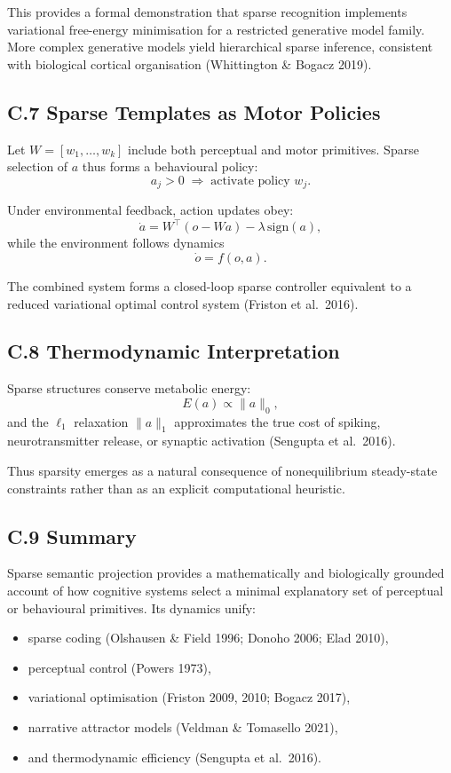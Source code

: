 \documentclass[11pt,a4paper,twoside]{article}
\begin{document}
This provides a formal demonstration that sparse recognition implements variational free-energy minimisation for a restricted generative model family. More complex generative models yield hierarchical sparse inference, consistent with biological cortical organisation (Whittington \& Bogacz 2019).

\subsection*{C.7 Sparse Templates as Motor Policies}

Let $W = [w_1,\dots,w_k]$ include both perceptual and motor primitives. Sparse selection of $a$ thus forms a behavioural policy:
\[
a_j > 0 \;\Rightarrow\; \text{activate policy } w_j.
\]

Under environmental feedback, action updates obey:
\[
\dot{a} = W^\top (o - Wa) - \lambda\,\mathrm{sign}(a),
\]
while the environment follows dynamics
\[
\dot{o} = f(o, a).
\]

The combined system forms a closed-loop sparse controller equivalent to a reduced variational optimal control system (Friston et al.\ 2016).

\subsection*{C.8 Thermodynamic Interpretation}

Sparse structures conserve metabolic energy:
\[
E(a) \propto \|a\|_0,
\]
and the $\ell_1$ relaxation $\|a\|_1$ approximates the true cost of spiking, neurotransmitter release, or synaptic activation (Sengupta et al.\ 2016).

Thus sparsity emerges as a natural consequence of nonequilibrium steady-state constraints rather than as an explicit computational heuristic.

\subsection*{C.9 Summary}

Sparse semantic projection provides a mathematically and biologically grounded account of how cognitive systems select a minimal explanatory set of perceptual or behavioural primitives. Its dynamics unify:

\begin{itemize}
\item sparse coding (Olshausen \& Field 1996; Donoho 2006; Elad 2010),
\item perceptual control (Powers 1973),
\item variational optimisation (Friston 2009, 2010; Bogacz 2017),
\item narrative attractor models (Veldman \& Tomasello 2021),
\item and thermodynamic efficiency (Sengupta et al.\ 2016).
\end{itemize}
\end{document}

